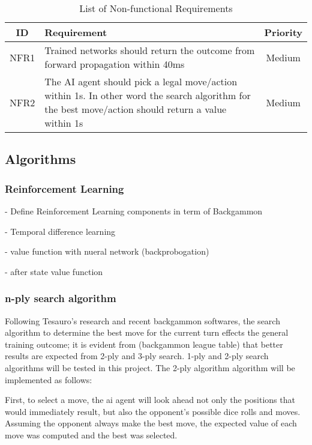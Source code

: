 \documentclass[12pt,a4paper]{article}
\begin{document}
\begin{table}[htb]
    \centering
    \caption{List of Non-functional Requirements}
    \vspace*{6pt}
    \label{nonreq}
    \begin{tabular}{cp{12cm}c}
        \hline
        \hline
        ID & Requirement & Priority \\ 
        \hline
        NFR1 & Trained networks should return the outcome from forward propagation within 40ms & Medium \\
        \hline
        NFR2 & The AI agent should pick a legal move/action within 1s. In other word the search algorithm for the best move/action should return a value within 1s & Medium \\
        \hline
    \end{tabular}
\end{table}
\subsection{Algorithms}
\subsubsection{Reinforcement Learning}
- Define Reinforcement Learning components in term of Backgammon

- Temporal difference learning

- value function with nueral network (backprobogation)

- after state value function

\subsubsection{n-ply search algorithm}
Following Tesauro's research and recent backgammon softwares, the search algorithm to determine the best move for the current turn effects the general training outcome; it is evident from (backgammon league table) that better results are expected from 2-ply and 3-ply search. 1-ply and 2-ply search algorithms will be tested in this project. The 2-ply algorithm algorithm will be implemented as follows:

First, to select a move, the ai agent will look ahead not only the positions that would immediately result, but also the opponent's possible dice rolls and moves. Assuming the opponent always make the best move, the expected value of each move was computed and the best was selected. 
\end{document}
